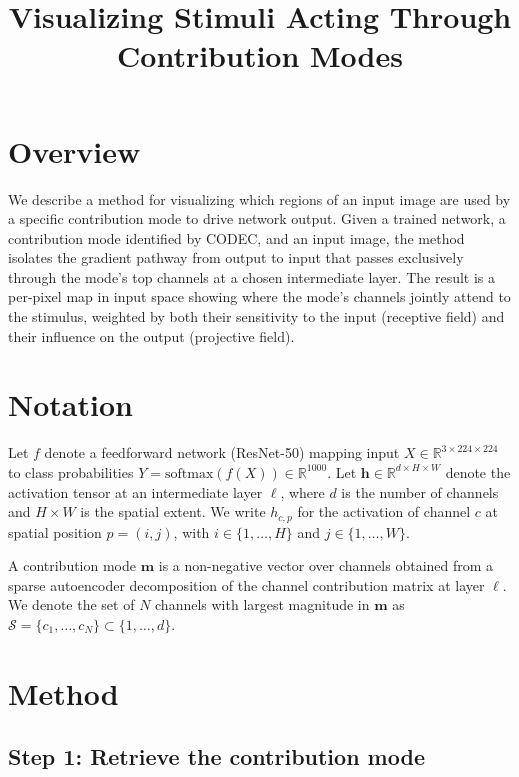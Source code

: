 \documentclass[11pt]{article}
\title{Visualizing Stimuli Acting Through Contribution Modes}
\date{}
\begin{document}
\maketitle

\section{Overview}

We describe a method for visualizing which regions of an input image are used by a specific contribution mode to drive network output.
Given a trained network, a contribution mode identified by CODEC, and an input image, the method isolates the gradient pathway from output to input that passes exclusively through the mode's top channels at a chosen intermediate layer.
The result is a per-pixel map in input space showing where the mode's channels jointly attend to the stimulus, weighted by both their sensitivity to the input (receptive field) and their influence on the output (projective field).

\section{Notation}

Let $f$ denote a feedforward network (ResNet-50) mapping input $X \in \mathbb{R}^{3 \times 224 \times 224}$ to class probabilities $Y = \mathrm{softmax}(f(X)) \in \mathbb{R}^{1000}$.
Let $\mathbf{h} \in \mathbb{R}^{d \times H \times W}$ denote the activation tensor at an intermediate layer $\ell$, where $d$ is the number of channels and $H \times W$ is the spatial extent.
We write $h_{c,p}$ for the activation of channel $c$ at spatial position $p = (i, j)$, with $i \in \{1,\ldots,H\}$ and $j \in \{1,\ldots,W\}$.

A contribution mode $\mathbf{m}$ is a non-negative vector over channels obtained from a sparse autoencoder decomposition of the channel contribution matrix at layer $\ell$.
We denote the set of $N$ channels with largest magnitude in $\mathbf{m}$ as $\mathcal{S} = \{c_1, \ldots, c_N\} \subset \{1, \ldots, d\}$.

\section{Method}

\subsection{Step 1: Retrieve the contribution mode}
\end{document}
